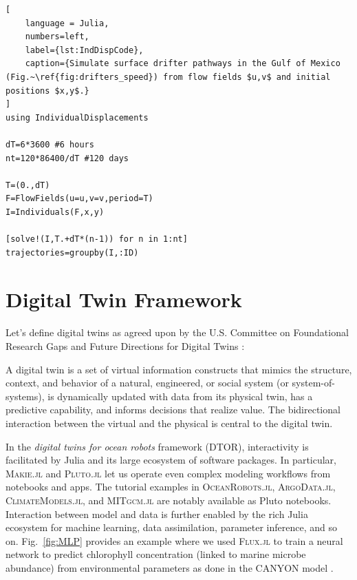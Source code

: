 \documentclass{juliacon}[12pt]
\newcommand{\pkg}[1]{{\small \textsc{#1}}}
\begin{document}
\begin{lstlisting}[
    language = Julia,
    numbers=left,
    label={lst:IndDispCode},
    caption={Simulate surface drifter pathways in the Gulf of Mexico (Fig.~\ref{fig:drifters_speed}) from flow fields $u,v$ and initial positions $x,y$.}
]
using IndividualDisplacements

dT=6*3600 #6 hours
nt=120*86400/dT #120 days

T=(0.,dT)
F=FlowFields(u=u,v=v,period=T)
I=Individuals(F,x,y)

[solve!(I,T.+dT*(n-1)) for n in 1:nt]
trajectories=groupby(I,:ID)
\end{lstlisting}


\section{Digital Twin Framework} \label{sec:DT}

Let's define digital twins as agreed upon by the U.S. Committee on Foundational Research Gaps and Future Directions for Digital Twins \cite{DT2024} : 

\begin{defi}
A digital twin is a set of virtual information constructs that mimics the structure, context, and behavior of a natural, engineered, or social system (or system-of-systems), is dynamically updated with data from its physical twin, has a predictive capability, and informs decisions that realize value. The bidirectional interaction between the virtual and the physical is central to the digital twin.
\end{defi}

In the {\it digital twins for ocean robots} framework (DTOR), interactivity is facilitated by Julia and its large ecosystem of software packages. In particular, \pkg{Makie.jl} \cite{Makie} and \pkg{Pluto.jl} \cite{Pluto} let us operate even complex modeling workflows from notebooks and apps. The tutorial examples in \pkg{OceanRobots.jl}, \pkg{ArgoData.jl}, \pkg{ClimateModels.jl}, and \pkg{MITgcm.jl} \cite{Forget2024b} are notably available as Pluto notebooks. Interaction between model and data is further enabled by the rich Julia ecosystem for machine learning, data assimilation, parameter inference, and so on. Fig.~\ref{fig:MLP} provides an example where we used \pkg{Flux.jl} \cite{Innes2018} to train a neural network to predict chlorophyll concentration (linked to marine microbe abundance) from environmental parameters as done in the CANYON model \cite{Sauzede2017,Bittig2018}.
\end{document}
